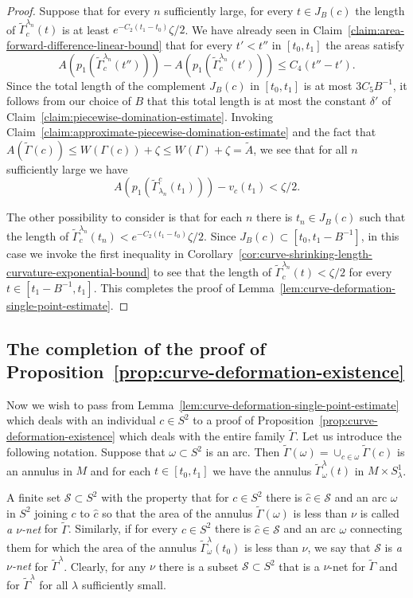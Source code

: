 \begin{proof}
Suppose  that for every $n$ sufficiently large, for every  $t\in
J_B(c)$ the length of $\widetilde\Gamma_c^{\lambda_n}(t)$ is at
least $e^{-C_2(t_1-t_0)}\zeta/2$. We have already seen in
Claim~\ref{claim:area-forward-difference-linear-bound} that for every $t'<t''$ in $[t_0,t_1]$ the
areas satisfy
$$A(p_1(\widetilde\Gamma_c^{\lambda_n}(t'')))-A(p_1(\widetilde\Gamma_c^{\lambda_n}(t')))\le
C_4(t''-t').$$ Since the total length of the complement $J_B(c)$ in
$[t_0,t_1]$ is at most $3C_5B^{-1}$, it follows from our choice of
$B$ that this total length is at most the constant $\delta'$ of
Claim~\ref{claim:piecewise-domination-estimate}. Invoking Claim~\ref{claim:approximate-piecewise-domination-estimate} and the fact
that $A(\widetilde\Gamma(c))\le W(\Gamma(c))+\zeta\le
W(\Gamma)+\zeta=\widetilde A$, we see that for all $n$ sufficiently
large we have
$$A(p_1(\widetilde\Gamma^c_{\lambda_n}(t_1)))-v_c(t_1)<\zeta/2.$$

The other possibility to consider is that for each $n$ there is
$t_n\in J_B(c)$ such that the length of
$\widetilde\Gamma_c^{\lambda_n}(t_n)<e^{-C_2(t_1-t_0)}\zeta/2$.
Since $J_B(c)\subset [t_0,t_1-B^{-1}]$, in this case we invoke the
first inequality in Corollary~\ref{cor:curve-shrinking-length-curvature-exponential-bound} to see that the
length of $\widetilde\Gamma_c^{\lambda_n}(t)<\zeta/2$ for every
$t\in [t_1-B^{-1},t_1]$. This completes the proof of
Lemma~\ref{lem:curve-deformation-single-point-estimate}.
\end{proof}

\subsection{The completion of the proof of
Proposition~{\ref{prop:curve-deformation-existence}}}

Now we wish to pass from  Lemma~\ref{lem:curve-deformation-single-point-estimate} which deals with an
individual $c\in S^2$ to a proof of Proposition~\ref{prop:curve-deformation-existence} which deals
with the entire family $\widetilde\Gamma$. Let us introduce the
following notation. Suppose that $\omega\subset S^2$ is an arc. Then
$\widetilde\Gamma(\omega)=\cup_{c\in \omega}\widetilde \Gamma(c)$ is
an annulus in $M$ and for each $t\in [t_0,t_1]$ we have
 the annulus $\widetilde\Gamma_\omega^\lambda(t)$ in $M\times
S^1_\lambda$.



A finite set ${\mathcal S}\subset S^2$ with the property that for
$c\in S^2$ there is $\hat c\in {\mathcal S}$ and an arc $\omega$ in
$S^2$ joining $c$ to $\hat c$ so that the area of the annulus
$\widetilde\Gamma(\omega)$ is less than $\nu$ is called {\em a
$\nu$-net} for $\widetilde\Gamma$. Similarly, if for every $c\in
S^2$ there is $\hat c\in {\mathcal S}$ and an arc $\omega$
connecting them for which the area of the annulus
$\widetilde\Gamma_\omega^\lambda(t_0)$ is less than $\nu$, we say
that ${\mathcal S}$ is {\em a $\nu$-net} for
$\widetilde\Gamma^\lambda$. Clearly, for any $\nu$ there is a subset
${\mathcal S}\subset S^2$ that is a $\nu$-net for $\widetilde\Gamma$
and for $\widetilde\Gamma^\lambda$ for all $\lambda$ sufficiently
small.



